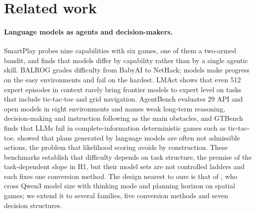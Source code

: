 \section{Related work}
\label{sec:related}

\paragraph{Language models as agents and decision-makers.}
SmartPlay \citep{wu2024smartplay} probes nine capabilities with six games, one of them a two-armed bandit, and finds that models differ by capability rather than by a single agentic skill. BALROG \citep{paglieri2025balrog} grades difficulty from BabyAI to NetHack; models make progress on the easy environments and fail on the hardest. LMAct \citep{ruoss2025lmact} shows that even 512 expert episodes in context rarely bring frontier models to expert level on tasks that include tic-tac-toe and grid navigation. AgentBench \citep{liu2024agentbench} evaluates 29 API and open models in eight environments and names weak long-term reasoning, decision-making and instruction following as the main obstacles, and GTBench \citep{duan2024gtbench} finds that LLMs fail in complete-information deterministic games such as tic-tac-toe. \citet{huang2022zeroshot} showed that plans generated by language models are often not admissible actions, the problem that likelihood scoring avoids by construction. These benchmarks establish that difficulty depends on task structure, the premise of the task-dependent slope in H1, but their model sets are not controlled ladders and each fixes one conversion method. The design nearest to ours is that of \citet{jiwatode2026spatial}, who cross Qwen3 model size with thinking mode and planning horizon on spatial games; we extend it to several families, five conversion methods and seven decision structures.

